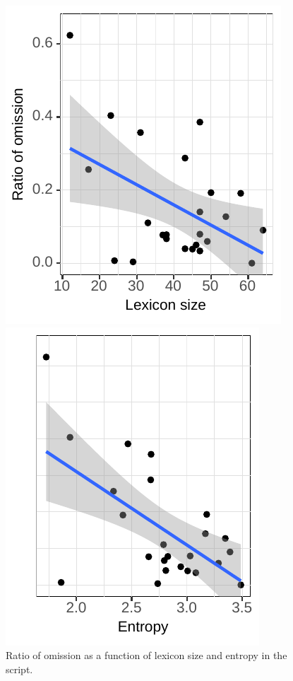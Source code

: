\begin{figure}
\hspace{-1em}\begin{minipage}{.48\textwidth}
  \includegraphics{figures/scr_production_omission_ratio_lexicon}
\end{minipage}
\begin{minipage}{.03\textwidth}
 
\end{minipage}
\begin{minipage}{.48\textwidth}
  \includegraphics{figures/scr_production_omission_ratio_entropy}
\end{minipage}

 \caption{Ratio of omission as a function of lexicon size and entropy in the script.\label{fig:scripts-ellratio-lexicon}}
\end{figure}

